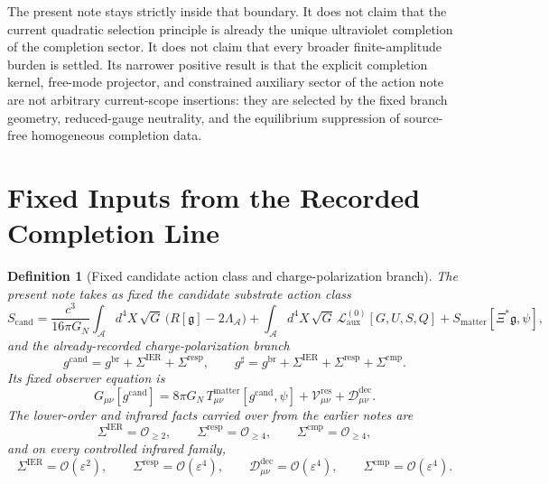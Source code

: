 \documentclass[11pt]{article}
\newcommand{\Sub}{\mathcal A}
\newcommand{\ObserverMap}{\Xi}
\newcommand{\BridgeMetric}{\mathfrak g}
\newcommand{\ObserverMetric}{g^{\mathrm{br}}}
\newcommand{\CandidateMetric}{g^{\mathrm{cand}}}
\newcommand{\CompletedMetric}{g^{\sharp}}
\newcommand{\BaseShift}{\Sigma^{\mathrm{IER}}}
\newcommand{\ResponseShift}{\Sigma^{\mathrm{resp}}}
\newcommand{\CompShift}{\Sigma^{\mathrm{cmp}}}
\newcommand{\ResidualCore}{\mathcal V_{\mu\nu}^{\mathrm{res}}}
\newcommand{\ResidualDec}{\mathcal D_{\mu\nu}^{\mathrm{dec}}}
\newcommand{\MatterAct}{S_{\mathrm{matter}}}
\newcommand{\epsIR}{\varepsilon}
\newtheorem{definition}{Definition}
\begin{document}
The present note stays strictly inside that boundary. It does not claim that the current quadratic selection principle is already the unique ultraviolet completion of the completion sector. It does not claim that every broader finite-amplitude burden is settled. Its narrower positive result is that the explicit completion kernel, free-mode projector, and constrained auxiliary sector of the action note are not arbitrary current-scope insertions: they are selected by the fixed branch geometry, reduced-gauge neutrality, and the equilibrium suppression of source-free homogeneous completion data.

\section{Fixed Inputs from the Recorded Completion Line}

\begin{definition}[Fixed candidate action class and charge-polarization branch]
\label{def:fixed}
The present note takes as fixed the candidate substrate action class
\begin{equation}
S_{\mathrm{cand}}
=
\frac{c^3}{16\pi G_N}
\int_{\Sub} d^4X\,\sqrt{G}\,\bigl(R[\BridgeMetric]-2\Lambda_{\Sub}\bigr)
+
\int_{\Sub} d^4X\,\sqrt{G}\,\mathcal L_{\mathrm{aux}}^{(0)}[G,U,S,Q]
+
\MatterAct[\ObserverMap^*\BridgeMetric,\psi],
\label{eq:Scand}
\end{equation}
and the already-recorded charge-polarization branch
\begin{equation}
\CandidateMetric
=
\ObserverMetric+\BaseShift+\ResponseShift,
\qquad
\CompletedMetric
=
\ObserverMetric+\BaseShift+\ResponseShift+\CompShift.
\label{eq:metrics}
\end{equation}
Its fixed observer equation is
\begin{equation}
G_{\mu\nu}[\CandidateMetric]
=
8\pi G_N\,T_{\mu\nu}^{\mathrm{matter}}[\CandidateMetric,\psi]
+\ResidualCore+\ResidualDec.
\label{eq:candidateeq}
\end{equation}
The lower-order and infrared facts carried over from the earlier notes are
\begin{equation}
\BaseShift=\mathcal O_{\ge 2},
\qquad
\ResponseShift=\mathcal O_{\ge 4},
\qquad
\CompShift=\mathcal O_{\ge 4},
\label{eq:orders}
\end{equation}
and on every controlled infrared family,
\begin{equation}
\BaseShift=\mathcal O(\epsIR^2),
\qquad
\ResponseShift=\mathcal O(\epsIR^4),
\qquad
\ResidualDec=\mathcal O(\epsIR^4),
\qquad
\CompShift=\mathcal O(\epsIR^4).
\label{eq:irorders}
\end{equation}
\end{definition}
\end{document}
